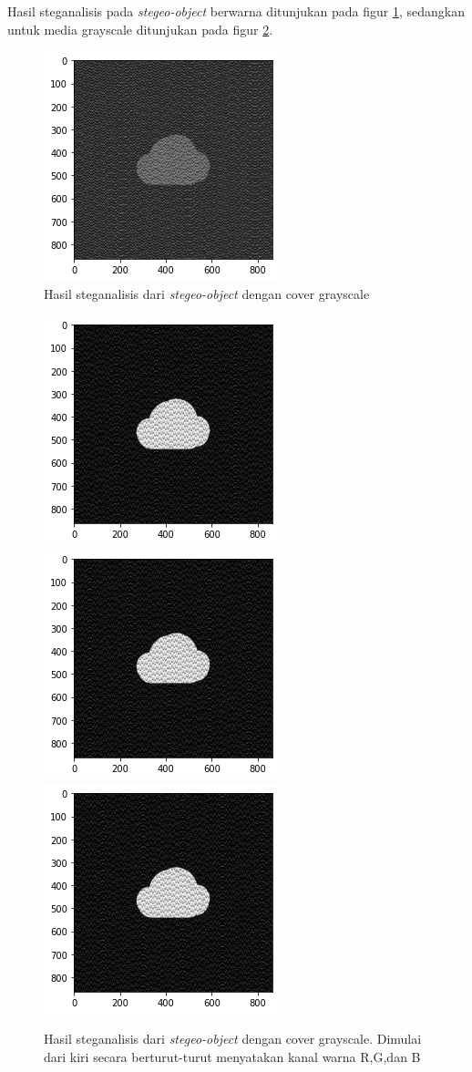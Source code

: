\documentclass[10pt,conference]{IEEEtran}
\theoremstyle{definition}
\begin{document}
Hasil steganalisis pada \emph{stegeo-object} berwarna ditunjukan pada figur \ref{fig:result3}, sedangkan untuk media grayscale
ditunjukan pada figur \ref{fig:result4}. 

\begin{figure}
    \centerline{
        \includegraphics[width=0.5\columnwidth]{steg-75000-gs.png}
    }
    \caption{Hasil steganalisis dari \emph{stegeo-object} dengan cover grayscale}
    \label{fig:result3} 
\end{figure}

\begin{figure}
    \centerline{
        \includegraphics[width=0.3\columnwidth]{steg-75000-r.png}
        \includegraphics[width=0.3\columnwidth]{steg-75000-g.png}
        \includegraphics[width=0.3\columnwidth]{steg-75000-b.png}
    }
    \caption{Hasil steganalisis dari \emph{stegeo-object} dengan cover grayscale. Dimulai dari kiri secara berturut-turut menyatakan kanal warna R,G,dan B}
    \label{fig:result4} 
\end{figure}
\end{document}
